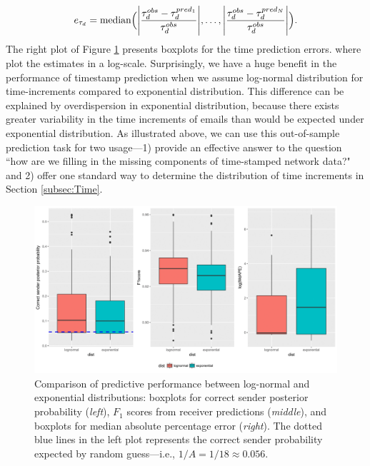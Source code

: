 \documentclass[ba]{imsart}
\numberwithin{equation}{section}
\theoremstyle{plain}
\DeclarePairedDelimiter\abs{\lvert}{\rvert}
\begin{document}
		\begin{equation}
		e_{\tau_d} = \mbox{median}\Big(\abs*{\frac{\tau^{obs}_d - \tau^{pred_1}_{d}}{\tau^{obs}_d}},\ldots, \abs*{\frac{\tau^{obs}_d - \tau^{pred_N}_{d}}{\tau^{obs}_d}}\Big).
		\end{equation}
	The right plot of Figure \ref{figure:PPEresults} presents boxplots for the time prediction errors. where plot the estimates in a log-scale. Surprisingly, we have a huge benefit in the performance of timestamp prediction when we assume log-normal distribution for time-increments compared to exponential distribution. This difference can be explained by overdispersion in exponential distribution, because there exists greater variability in the time increments of emails than would be expected under exponential distribution. As illustrated above, we can use this out-of-sample prediction task for two usage---1) provide an effective answer to the question ``how are we filling in the missing components of time-stamped network data?" and 2) offer one standard way to determine the distribution of time increments in Section \ref{subsec:Time}. 
	\begin{figure}[!t]
		\centering
		\includegraphics[width=1\textwidth]{img/PPEplotnew-1.png}	
		\caption {Comparison of predictive performance between log-normal and exponential distributions: boxplots for correct sender posterior probability (\textit{left}), $F_1$ scores from receiver predictions (\textit{middle}), and boxplots for median absolute percentage error (\textit{right}). The dotted blue lines in the left plot represents the correct sender probability expected by random guess---i.e., $1/A=1/18\approx0.056$.}
		\label{figure:PPEresults}
	\end{figure}
\end{document}
